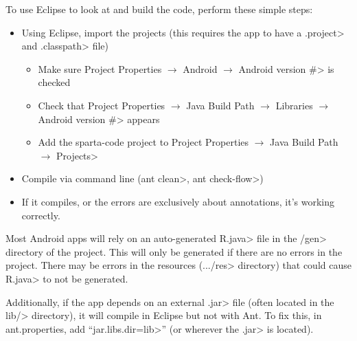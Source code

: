 To use Eclipse to look at and build the code, perform these simple
steps:
\begin{itemize}
\item
Using Eclipse, import the projects (this requires the app to have a
\<.project> and \<.classpath> file)
  \begin{itemize}
    \item
    Make sure
    \<Project Properties $\rightarrow$ Android $\rightarrow$ Android
    version \#> is checked

    \item
    Check that
    \<Project Properties $\rightarrow$ Java Build Path $\rightarrow$
    Libraries $\rightarrow$ Android version \#> appears

    \item
    Add the sparta-code project to
    \<Project Properties $\rightarrow$ Java Build Path $\rightarrow$ Projects>
    
  \end{itemize}

\item Compile via command line (\<ant clean>, \<ant check-flow>)

\item If it compiles, or the errors are exclusively about annotations,
  it's working correctly.
\end{itemize}

Most Android apps will rely on an auto-generated \<R.java> file
in the \</gen> directory of the project. This will only be generated
if there are no errors in the project. There may be errors in the
resources (\<.../res> directory) that could cause \<R.java> to not be
generated.

Additionally, if the app depends on an external \<.jar> file (often
located in the \<lib/> directory), it will compile in Eclipse but not
with Ant. To fix this, in ant.properties, add ``\<jar.libs.dir=lib>''
(or wherever the \<.jar> is located).




